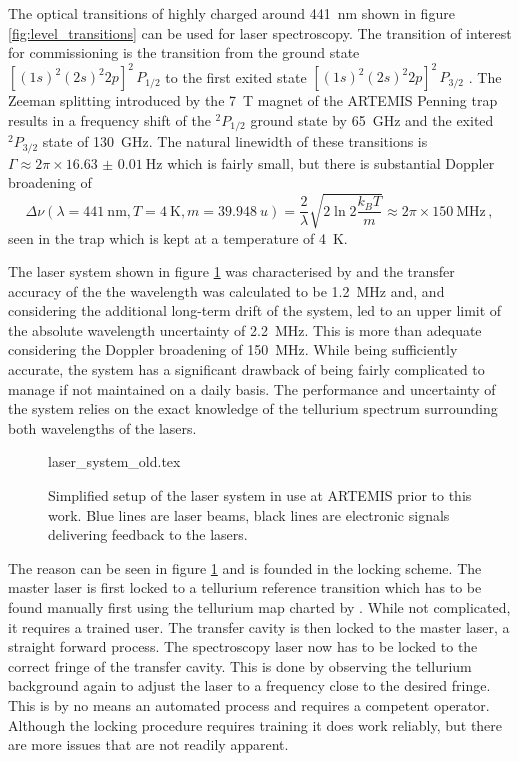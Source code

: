 The optical transitions of highly charged  around \qty{441}{\nm} shown in figure \ref{fig:level_transitions} can be used for laser spectroscopy. The transition of interest for commissioning is the transition from the ground state $[(1s)^2 (2s)^2 2p]^2 \, P_{1/2}$ to the first exited state $[(1s)^2 (2s)^2 2p]^2 \, P_{3/2}$ \cite{optical_transitions_ar13}. The Zeeman splitting introduced by the \qty{7}{\tesla} magnet of the ARTEMIS Penning trap results in a frequency shift of the $^2P_{1/2}$ ground state by \qty{65}{\GHz} and the exited $^2 P_{3/2}$ state of \qty{130}{\GHz}. The natural linewidth of these transitions is $\Gamma \approx 2 \pi \times \qty{16.63(1)}{\Hz}$ which is fairly small, but there is substantial Doppler broadening of
\begin{equation}
    \Delta \nu (\lambda = \qty{441}{\nm}, T=\qty{4}{\K}, m=\qty{39.948}{u}) = \frac{2}{\lambda}\sqrt{2 \ln 2 \frac{k_B T}{m}} \approx 2 \pi \times \qty{150}{\MHz} \, , \label{eqn:doppler_broadening}
\end{equation}
seen in the trap which is kept at a temperature of \qty{4}{\K}.

The laser system shown in figure \ref{fig:laser_system_old} was characterised by \citeauthor{thesis_alex} \cite{thesis_alex} and the transfer accuracy of the the wavelength was calculated to be \qty{1.2}{\MHz} and, and considering the additional long-term drift of the system, led to an upper limit of the absolute wavelength uncertainty of \qty{2.2}{\MHz}. This is more than adequate considering the Doppler broadening of \qty{150}{\MHz}. While being sufficiently accurate, the system has a significant drawback of being fairly complicated to manage if not maintained on a daily basis. The performance and uncertainty of the system relies on the exact knowledge of the tellurium spectrum surrounding both wavelengths of the lasers.
\begin{figure}[ht]
    \centering
        {laser_system_old.tex}
    \caption{Simplified setup of the laser system in use at ARTEMIS prior to this work. Blue lines are laser beams, black lines are electronic signals delivering feedback to the lasers.}
    \label{fig:laser_system_old}
\end{figure}

The reason can be seen in figure \ref{fig:laser_system_old} and is founded in the locking scheme. The master laser is first locked to a tellurium reference transition which has to be found manually first using the tellurium map charted by \cite{thesis_alex}. While not complicated, it requires a trained user. The transfer cavity is then locked to the master laser, a straight forward process. The spectroscopy laser now has to be locked to the correct fringe of the transfer cavity. This is done by observing the tellurium background again to adjust the laser to a frequency close to the desired fringe. This is by no means an automated process and requires a competent operator. Although the locking procedure requires training it does work reliably, but there are more issues that are not readily apparent.

